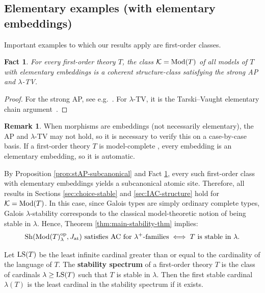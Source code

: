 \documentclass[10pt]{amsart}
\numberwithin{equation}{section}
\theoremstyle{plain}
\newtheorem{fact}{Fact}
\theoremstyle{definition}
\newtheorem*{remark}{Remark}
\newcommand{\K}{\mathcal{K}}
\begin{document}
\subsection{Elementary examples (with elementary embeddings)}

Important examples to which our results apply are first-order classes.

\begin{fact}\label{fact:elementary-class}
For every first-order theory $T$, the class $\K={\rm Mod}(T)$ of all models of $T$ with elementary embeddings is a coherent structure-class satisfying the strong AP and $\lambda$-TV.
\end{fact}

\begin{proof}
For the strong AP, see e.g.~\cite[Section 6.4.3]{Hod93}.
For $\lambda$-TV, it is the Tarski--Vaught elementary chain argument~\cite[Proposition 2.3.11]{Mar02}.
\end{proof}


\begin{remark}
When morphisms are embeddings (not necessarily elementary), the AP and $\lambda$-TV may not hold, so it is necessary to verify this on a case-by-case basis.
If a first-order theory $T$ is model-complete \cite[Definition 3.1.13]{Mar02}, every embedding is an elementary embedding, so it is automatic.
\end{remark}

By Proposition \ref{prop:stAP-subcanonical} and Fact \ref{fact:elementary-class}, every such first-order class with elementary embeddings yields a subcanonical atomic site.
Therefore, all results in Sections \ref{sec:choice-stable} and \ref{sec:IAC-structure} hold for $\K={\rm Mod}(T)$.
In this case, since Galois types are simply ordinary complete types, Galois $\lambda$-stability corresponds to the classical model-theoretic notion of being stable in $\lambda$.
Hence, Theorem \ref{thm:main-stability-thm} implies:
\[
\text{${\rm Sh}({\rm Mod}(T)_\lambda^{\rm op},J_{\rm at})$ satisfies AC for $\lambda^+$-families}
\iff
\text{$T$ is stable in $\lambda$.}
\]

Let ${\rm LS}(T)$ be the least infinite cardinal greater than or equal to the cardinality of the language of $T$.
The {\bf stability spectrum} of a first-order theory $T$ is the class of cardinals $\lambda\geq {\rm LS}(T)$ such that $T$ is stable in $\lambda$.
Then the first stable cardinal $\lambda(T)$ is the least cardinal in the stability spectrum if it exists.
\end{document}
